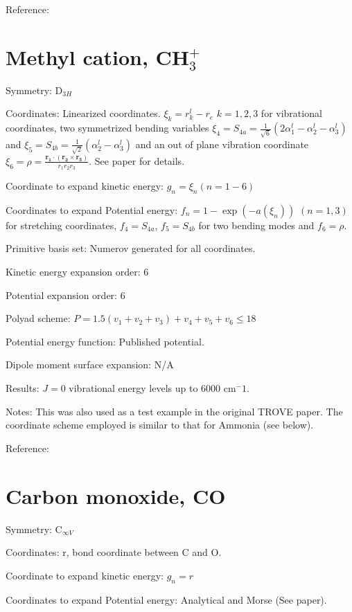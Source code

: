 Reference: \cite{TROVE}


\section{Methyl cation, CH$_3^+$}


Symmetry: D$_{3H}$

Coordinates: Linearized coordinates. $\xi_k = r_k^l - r_e$ $k = 1,2,3$ for vibrational coordinates,
two symmetrized bending variables $\xi_4 = S_{4a} = \frac{1}{\sqrt{6}} (2 \alpha_1^l - \alpha_2^l - \alpha_3^l)$ and 
$\xi_5 = S_{4b} = \frac{1}{\sqrt{2}}(\alpha_2^l - \alpha_3^l)$ and an out of plane vibration coordinate
$\xi_6 = \rho = \frac{\mathbf{r_1} \cdot (\mathbf{r_2} \times \mathbf{r_3} )} {r_{1}r_{2}r_{3}} $. See paper for details.


Coordinate to expand kinetic energy: $g_n = \xi_n (n=1-6)$

Coordinates to expand Potential energy: $f_n = 1 - \exp(-a(\xi_n))$ $(n = 1, 3)$ for stretching coordinates, 
$f_4 = S_{4a}$, $f_5 = S_{4b}$ for two bending modes and $f_6 = \rho$. 

Primitive basis set: Numerov generated for all coordinates.

Kinetic energy expansion order: 6

Potential expansion order: 6

Polyad scheme: $P = 1.5(v_1 + v_2 + v_3) + v_4 + v_5 + v_6 \leq 18$

Potential energy function: Published potential.

Dipole moment surface expansion: N/A

Results: $J = 0$ vibrational energy levels up to 6000 cm$^-1$. 

Notes: This was also used as a test example in the original TROVE paper.
The coordinate scheme employed is similar to that for Ammonia (see below).

Reference: \cite{TROVE}



\section{Carbon monoxide, CO}


Symmetry: C$_{\infty V}$

Coordinates: r, bond coordinate between C and O.


Coordinate to expand kinetic energy: $g_n = r$

Coordinates to expand Potential energy: Analytical and Morse (See paper). 

